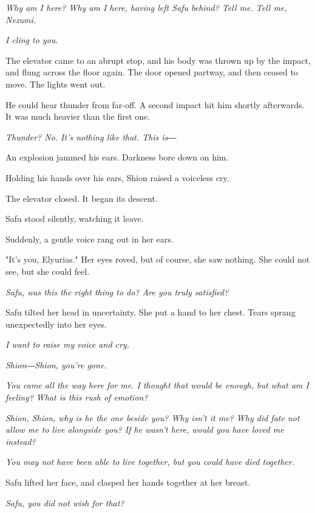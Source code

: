 \emph{Why am I here? Why am I here, having left Safu behind? Tell me. Tell me,
	Nezumi.}

\emph{I cling to you.}

The elevator came to an abrupt stop, and his body was thrown up by the
impact, and flung across the floor again. The door opened partway, and
then ceased to move. The lights went out.

He could hear thunder from far-off. A second impact hit him shortly
afterwards. It was much heavier than the first one.

\emph{Thunder? No. It's nothing like that. This is―}

An explosion jammed his ears. Darkness bore down on him.

Holding his hands over his ears, Shion raised a voiceless cry.

The elevator closed. It began its descent.

Safu stood silently, watching it leave.

Suddenly, a gentle voice rang out in her ears.

"It's you, Elyurias." Her eyes roved, but of course, she saw nothing.
She could not see, but she could feel.

\myspace

\emph{Safu, was this the right thing to do? Are you truly satisfied?}

\myspace

Safu tilted her head in uncertainty. She put a hand to her chest. Tears
sprang unexpectedly into her eyes.

\emph{I want to raise my voice and cry.}

\emph{Shion―Shion, you're gone.}

\emph{You came all the way here for me. I thought that would be enough, but
	what am I feeling? What is this rush of emotion?}

\emph{Shion, Shion, why is he the one beside you? Why isn't it me? Why did
	fate not allow me to live alongside you? If he wasn't here, would you
	have loved me instead?}

\myspace

\emph{You may not have been able to live together, but you could have died
	together.}

\myspace

Safu lifted her face, and clasped her hands together at her breast.

\myspace

\emph{Safu, you did not wish for that?}

